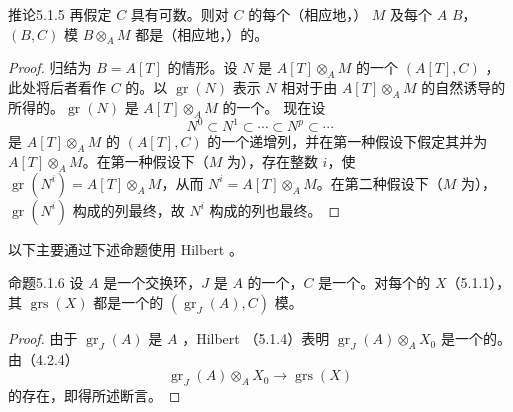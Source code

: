 \begin{SGAresult}{推论}{5.1.5}
再假定 $C$ 具有可数。则对 $C$ 的每个（相应地，） $M$ 及每个 $A$  $B$，$(B,C)$ 模 $B\otimes_A M$ 都是（相应地，）的。
\end{SGAresult}
\begin{proof}
归结为 $B=A[T]$ 的情形。设 $N$ 是 $A[T]\otimes_A M$ 的一个 $(A[T],C)$ ，此处将后者看作 $C$ 的。以 $\operatorname{gr}(N)$ 表示 $N$ 相对于由 $A[T]\otimes_A M$ 的自然诱导的所得的。$\operatorname{gr}(N)$ 是 $A[T]\otimes_A M$ 的一个。
现在设
\[
N^0\subset N^1\subset\cdots\subset N^p\subset\cdots
\]
是 $A[T]\otimes_A M$ 的 $(A[T],C)$ 的一个递增列，并在第一种假设下假定其并为 $A[T]\otimes_A M$。在第一种假设下（$M$ 为），存在整数 $i$，使 $\operatorname{gr}(N^i)=A[T]\otimes_A M$，从而 $N^i=A[T]\otimes_A M$。在第二种假设下（$M$ 为），$\operatorname{gr}(N^i)$ 构成的列最终，故 $N^i$ 构成的列也最终。
\end{proof}
以下主要通过下述命题使用 Hilbert 。

\begin{SGAresult}{命题}{5.1.6}
设 $A$ 是一个交换环，$J$ 是 $A$ 的一个，$C$ 是一个。对每个的 $X$（5.1.1），其 $\operatorname{grs}(X)$ 都是一个的 $(\operatorname{gr}_J(A),C)$ 模。
\end{SGAresult}
\begin{proof}
由于 $\operatorname{gr}_J(A)$ 是 $A$ ，Hilbert （5.1.4）表明 $\operatorname{gr}_J(A)\otimes_A X_0$ 是一个的。由（4.2.4）
\[
\operatorname{gr}_J(A)\otimes_A X_0\longrightarrow\operatorname{grs}(X)
\]
的存在，即得所述断言。
\end{proof}

